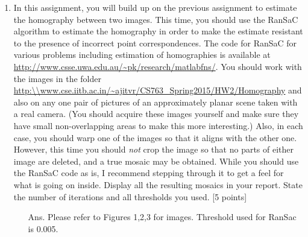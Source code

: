 \documentclass[11pt]{article}
\begin{document}
\begin{enumerate}
\item In this assignment, you will build up on the previous assignment to estimate the homography between two images. This time, you should use the RanSaC algorithm to estimate the homography in order to make the estimate resistant to the presence of incorrect point correspondences. The code for RanSaC for various problems including estimation of homographies is available at \url{http://www.csse.uwa.edu.au/~pk/research/matlabfns/}. You should work with the images in the folder \url{http:\\www.cse.iitb.ac.in/~ajitvr/CS763_Spring2015/HW2/Homography} and also on any one pair of pictures of an approximately planar scene taken with a real camera. (You should acquire these images yourself and make sure they have small non-overlapping areas to make this more interesting.) Also, in each case, you should warp one of the images so that it aligns with the other one. However, this time you should \emph{not} crop the image so that no parts of either image are deleted, and a true mosaic may be obtained. While you should use the RanSaC code as is, I recommend stepping through it to get a feel for what is going on inside. Display all the resulting mosaics in your report. State the number of iterations and all thresholds you used. \textsf{[5 points]}
\begin{itemize}
\item[Ans.] Please refer to Figures 1,2,3 for images. Threshold used for RanSac is 0.005. 
\begin{figure}[!htb]
    \centering

\end{figure}
\end{itemize}
\end{enumerate}
\end{document}
